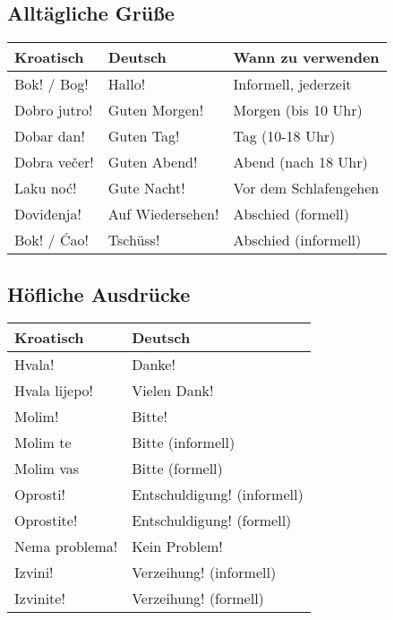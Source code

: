 \begin{vocabulary}
\subsection*{Alltägliche Grüße}

\begin{center}
\begin{tabular}{lll}
\toprule
Kroatisch & Deutsch & Wann zu verwenden \\
\midrule
Bok! / Bog! & Hallo! & Informell, jederzeit \\
Dobro jutro! & Guten Morgen! & Morgen (bis 10 Uhr) \\
Dobar dan! & Guten Tag! & Tag (10-18 Uhr) \\
Dobra večer! & Guten Abend! & Abend (nach 18 Uhr) \\
Laku noć! & Gute Nacht! & Vor dem Schlafengehen \\
Doviđenja! & Auf Wiedersehen! & Abschied (formell) \\
Bok! / Ćao! & Tschüss! & Abschied (informell) \\
\bottomrule
\end{tabular}
\end{center}

\subsection*{Höfliche Ausdrücke}

\begin{center}
\begin{tabular}{ll}
\toprule
Kroatisch & Deutsch \\
\midrule
Hvala! & Danke! \\
Hvala lijepo! & Vielen Dank! \\
Molim! & Bitte! \\
Molim te & Bitte (informell) \\
Molim vas & Bitte (formell) \\
Oprosti! & Entschuldigung! (informell) \\
Oprostite! & Entschuldigung! (formell) \\
Nema problema! & Kein Problem! \\
Izvini! & Verzeihung! (informell) \\
Izvinite! & Verzeihung! (formell) \\
\bottomrule
\end{tabular}
\end{center}


\end{vocabulary}
